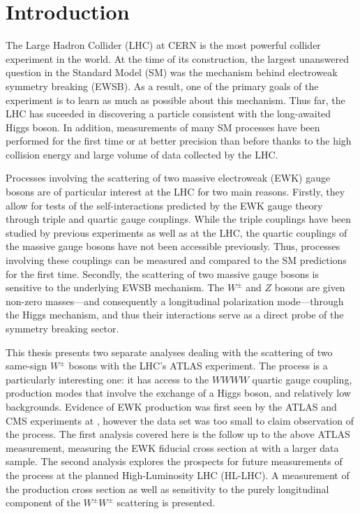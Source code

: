\chapter[Introduction][Introduction]{Introduction}
The Large Hadron Collider (LHC) at CERN is the most powerful collider experiment in the world.
At the time of its construction, the largest unanswered question in the Standard Model (SM) was the mechanism behind electroweak symmetry breaking (EWSB).
As a result, one of the primary goals of the experiment is to learn as much as possible about this mechanism.
Thus far, the LHC has suceeded in discovering a particle consistent with the long-awaited Higgs boson. %
In addition, measurements of many SM processes have been performed for the first time or at better precision than before thanks to the high collision energy and large volume of data collected by the LHC.

Processes involving the scattering of two massive electroweak (EWK) gauge bosons are of particular interest at the LHC for two main reasons.
Firstly, they allow for tests of the self-interactions predicted by the EWK gauge theory through triple and quartic gauge couplings.
While the triple couplings have been studied by previous experiments as well as at the LHC, the quartic couplings of the massive gauge bosons have not been accessible previously.
Thus, processes involving these couplings can be measured and compared to the SM predictions for the first time.
Secondly, the scattering of two massive gauge bosons is sensitive to the underlying EWSB mechanism.
The $W^{\pm}$ and $Z$ bosons are given non-zero masses---and consequently a longitudinal polarization mode---through the Higgs mechanism, and thus their interactions serve as a direct probe of the symmetry breaking sector.

This thesis presents two separate analyses dealing with the scattering of two same-sign $W^{\pm}$ bosons with the LHC's ATLAS experiment.
The \ssww process is a particularly interesting one: it has access to the $WWWW$ quartic gauge coupling, production modes that involve the exchange of a Higgs boson, and relatively low backgrounds.
Evidence of EWK \ssww production was first seen by the ATLAS and CMS experiments at , however the data set was too small to claim observation of the process.
The first analysis covered here is the follow up to the above ATLAS measurement, measuring the EWK fiducial cross section at  with a larger data sample.
The second analysis explores the prospects for future measurements of the \ssww process at the planned High-Luminosity LHC (HL-LHC).
A measurement of the production cross section as well as sensitivity to the purely longitudinal component of the $W^{\pm}W^{\pm}$ scattering is presented.

